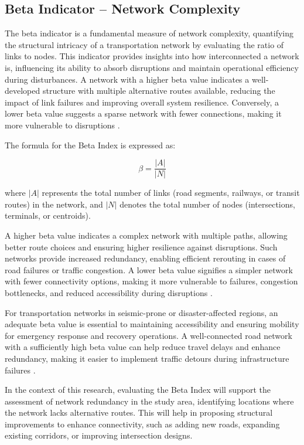 \subsection{Beta Indicator – Network Complexity}
The beta indicator is a fundamental measure of network complexity, quantifying the structural intricacy of a transportation network by evaluating the ratio of links to nodes. This indicator provides insights into how interconnected a network is, influencing its ability to absorb disruptions and maintain operational efficiency during disturbances. A network with a higher beta value indicates a well-developed structure with multiple alternative routes available, reducing the impact of link failures and improving overall system resilience. Conversely, a lower beta value suggests a sparse network with fewer connections, making it more vulnerable to disruptions \cite{taylor2017}.

The formula for the Beta Index is expressed as:

\begin{equation}
\beta = \frac{|A|}{|N|}
\end{equation}

where $|A|$ represents the total number of links (road segments, railways, or transit routes) in the network, and $|N|$ denotes the total number of nodes (intersections, terminals, or centroids).

A higher beta value indicates a complex network with multiple paths, allowing better route choices and ensuring higher resilience against disruptions. Such networks provide increased redundancy, enabling efficient rerouting in cases of road failures or traffic congestion. A lower beta value signifies a simpler network with fewer connectivity options, making it more vulnerable to failures, congestion bottlenecks, and reduced accessibility during disruptions \cite{derrible2010}.

For transportation networks in seismic-prone or disaster-affected regions, an adequate beta value is essential to maintaining accessibility and ensuring mobility for emergency response and recovery operations. A well-connected road network with a sufficiently high beta value can help reduce travel delays and enhance redundancy, making it easier to implement traffic detours during infrastructure failures \cite{taylor2017}.

In the context of this research, evaluating the Beta Index will support the assessment of network redundancy in the study area, identifying locations where the network lacks alternative routes. This will help in proposing structural improvements to enhance connectivity, such as adding new roads, expanding existing corridors, or improving intersection designs.

